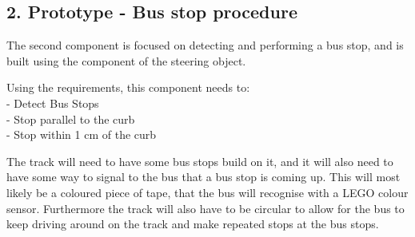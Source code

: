 \subsection{2. Prototype - Bus stop procedure}
The second component is focused on detecting and performing a bus stop, and is built using the component of the steering object. 

Using the requirements, this component needs to:\\
    - Detect Bus Stops\\
    - Stop parallel to the curb\\
    - Stop within 1 cm of the curb

The track will need to have some bus stops build on it, and it will also need to have some way to signal to the bus that a bus stop is coming up. This will most likely be a coloured piece of tape, that the bus will recognise with a LEGO colour sensor.  Furthermore the track will also have to be circular to allow for the bus to keep driving around on the track and make repeated stops at the bus stops.










